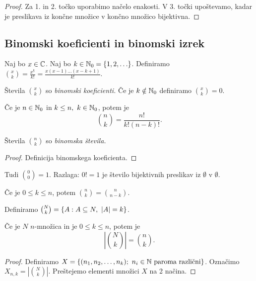 \begin{proof}
    Za 1. in 2. točko uporabimo načelo enakosti. V 3. točki upoštevamo, kadar je preslikava iz končne množice v končno množico bijektivna.
\end{proof}

\newpage
\subsection{Binomski koeficienti in binomski izrek}
\begin{definicija}
    Naj bo $x \in \mathbb{C}$. Naj bo $k \in \mathbb{N}_0 = \left\{1, 2, \ldots\right\}$. Definiramo $\binom{x}{k} = \frac{x^{\underline{k}}}{k!} = \frac{x(x-1)\ldots (x-k+1)}{k!}$. 
    
    Števila $\binom{x}{k}$ so \emph{binomski koeficienti.}
    Če je $k \notin \mathbb{N}_0$ definiramo $\binom{x}{k} = 0$.
\end{definicija}

\begin{trditev}
    Če je $n \in \mathbb{N}_0$ in $k \leq n, \ k \in \mathbb{N}_0$, potem je 
    $$\binom{n}{k} = \frac{n!}{k!(n-k)!}.$$

    Števila $\binom{n}{k}$ so \emph{binomska števila.}
\end{trditev}

\begin{proof}
    Definicija binomskega koeficienta.
\end{proof}

\begin{opomba}
    Tudi $\binom{0}{0} = 1$. Razlaga: $0! = 1$ je število bijektivnih preslikav iz $\emptyset$ v $\emptyset$.
\end{opomba}

\begin{opomba}
    Če je $0 \leq k \leq n$, potem $\binom{n}{k} = \binom{n}{n-k}$.
\end{opomba}

\begin{definicija}
    Definiramo $\binom{N}{k} = \left\{A: A \subseteq N, \ |A| = k\right\}$.
\end{definicija}

\begin{trditev}
    Če je $N$ $n$-množica in je $0 \leq k \leq n$, potem je 
    $$\left| \binom{N}{k} \right| = \binom{n}{k}.$$
\end{trditev}

\begin{proof}
    Definiramo $X = \left\{(n_1, n_2, \ldots, n_k); \ n_i \in \mathbb{N} \text{ paroma različni}\right\}$. Označimo $X_{n,k} = \left| \binom{N}{k} \right|$. Preštejemo elementi množici $X$ na 2 načina.
\end{proof}

